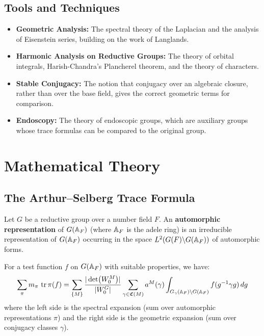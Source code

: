 \subsection{Tools and Techniques}

\begin{itemize}
    \item \textbf{Geometric Analysis:} The spectral theory of the Laplacian and the analysis of Eisenstein series, building on the work of Langlands.
    \item \textbf{Harmonic Analysis on Reductive Groups:} The theory of orbital integrals, Harish-Chandra's Plancherel theorem, and the theory of characters.
    \item \textbf{Stable Conjugacy:} The notion that conjugacy over an algebraic closure, rather than over the base field, gives the correct geometric terms for comparison.
    \item \textbf{Endoscopy:} The theory of endoscopic groups, which are auxiliary groups whose trace formulas can be compared to the original group.
\end{itemize}

\section{Mathematical Theory}

\subsection{The Arthur--Selberg Trace Formula}

\begin{definition}
Let $G$ be a reductive group over a number field $F$. An \textbf{automorphic representation} of $G(\mathbb{A}_F)$ (where $\mathbb{A}_F$ is the adele ring) is an irreducible representation of $G(\mathbb{A}_F)$ occurring in the space $L^2(G(F)\backslash G(\mathbb{A}_F))$ of automorphic forms.
\end{definition}

\begin{theorem}
For a test function $f$ on $G(\mathbb{A}_F)$ with suitable properties, we have:
\[
\sum_{\pi} m_\pi \, \operatorname{tr} \pi(f) = \sum_{\{M\}} \frac{|\det(W_0^M)|}{|W_0^G|} \sum_{\gamma \in \mathfrak{C}(M)} a^M(\gamma) \int_{G_\gamma(\mathbb{A}_F) \backslash G(\mathbb{A}_F)} f(g^{-1}\gamma g) \, dg
\]
where the left side is the spectral expansion (sum over automorphic representations $\pi$) and the right side is the geometric expansion (sum over conjugacy classes $\gamma$).
\end{theorem}


